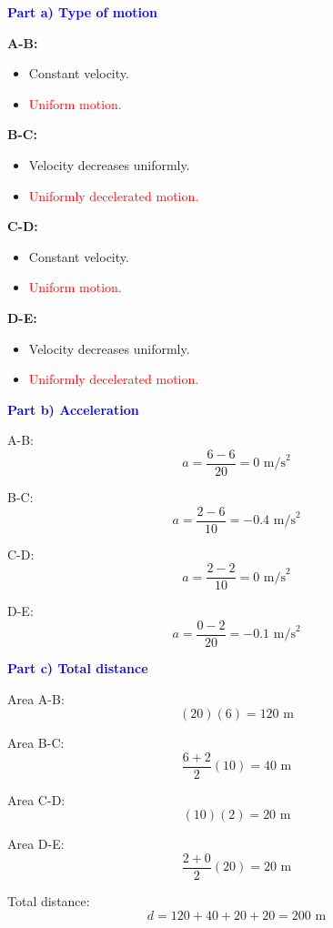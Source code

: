 \begin{exercise}
\begin{solu}
    \textbf{\textcolor{blue}{Part a) Type of motion}}

    \textbf{A-B:}
    \begin{itemize}
        \item Constant velocity.
        \item \textcolor{red}{Uniform motion.}
    \end{itemize}

    \textbf{B-C:}
    \begin{itemize}
        \item Velocity decreases uniformly.
        \item \textcolor{red}{Uniformly decelerated motion.}
    \end{itemize}

    \textbf{C-D:}
    \begin{itemize}
        \item Constant velocity.
        \item \textcolor{red}{Uniform motion.}
    \end{itemize}

    \textbf{D-E:}
    \begin{itemize}
        \item Velocity decreases uniformly.
        \item \textcolor{red}{Uniformly decelerated motion.}
    \end{itemize}

    \textbf{\textcolor{blue}{Part b) Acceleration}}

    A-B:
    \[
    a=\frac{6-6}{20}=0\text{ m/s}^2
    \]

    B-C:
    \[
    a=\frac{2-6}{10}=-0.4\text{ m/s}^2
    \]

    C-D:
    \[
    a=\frac{2-2}{10}=0\text{ m/s}^2
    \]

    D-E:
    \[
    a=\frac{0-2}{20}=-0.1\text{ m/s}^2
    \]

    \textbf{\textcolor{blue}{Part c) Total distance}}

    Area A-B:
    \[
    (20)(6)=120\text{ m}
    \]

    Area B-C:
    \[
    \frac{6+2}{2}(10)=40\text{ m}
    \]

    Area C-D:
    \[
    (10)(2)=20\text{ m}
    \]

    Area D-E:
    \[
    \frac{2+0}{2}(20)=20\text{ m}
    \]

    Total distance:
    \[
    d=120+40+20+20=\boxed{200\text{ m}}
    \]

    \end{solu}
\end{exercise}

